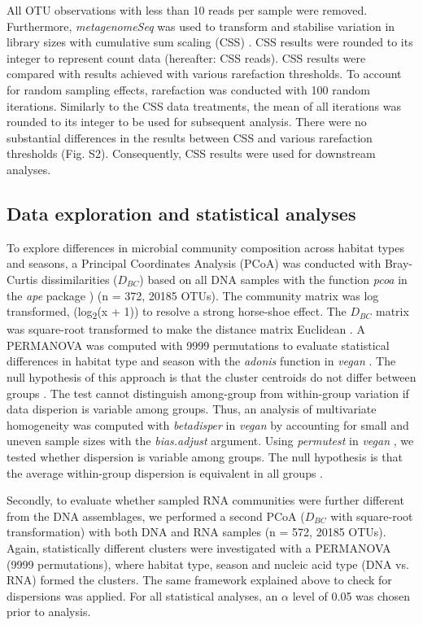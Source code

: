 \documentclass[12pt,a4paper]{article} %
\begin{document}
All OTU observations with less than 10 reads per sample were removed. Furthermore, \textit{metagenomeSeq} was used to transform and stabilise variation in library sizes with cumulative sum scaling (CSS) \citep{Paulson2013}. CSS results were rounded to its integer to represent count data (hereafter: CSS reads). CSS results were compared with results achieved with various rarefaction thresholds. To account for random sampling effects, rarefaction was conducted with 100 random iterations. Similarly to the CSS data treatments, the mean of all iterations was rounded to its integer to be used for subsequent analysis. There were no substantial differences in the results between CSS and various rarefaction thresholds (Fig. S2). Consequently, CSS results were used for downstream analyses.

\subsection*{Data exploration and statistical analyses}
To explore differences in microbial community composition across habitat types and seasons, a Principal Coordinates Analysis (PCoA) was conducted with Bray-Curtis dissimilarities ($D_{BC}$) \citep{Bray1957, Legendre1998} based on all DNA samples with the function \textit{pcoa} in the \textit{ape} package \citep{Paradis2018}) (n = 372, 20185 OTUs). The community matrix was log transformed, (log\textsubscript{2}(x + 1)) to resolve a strong horse-shoe effect. The $D_{BC}$ matrix was square-root transformed to make the distance matrix Euclidean \citep{Legendre1998, Borcard2011}. A PERMANOVA was computed with 9999 permutations to evaluate statistical differences in habitat type and season  with the \textit{adonis} function in \textit{vegan} \citep{Oksanen2017}. The null hypothesis of this approach is that the cluster centroids do not differ between groups \citep{Anderson2013}. The test cannot distinguish among-group from within-group variation if data disperion is variable among groups. Thus, an analysis of multivariate homogeneity was computed with \textit{betadisper} in \textit{vegan} \citep{Oksanen2017} by accounting for small and uneven sample sizes with the \textit{bias.adjust} argument. Using \textit{permutest} in \textit{vegan} \citep{Oksanen2017}, we tested whether dispersion is variable among groups. The null hypothesis is that the average within-group dispersion is equivalent in all groups \citep{Anderson2013}.

Secondly, to evaluate whether sampled RNA communities were further different from the DNA assemblages, we performed a second PCoA ($D_{BC}$ with square-root transformation) with both DNA and RNA samples (n = 572, 20185 OTUs). Again, statistically different clusters were investigated with a PERMANOVA (9999 permutations), where habitat type, season and nucleic acid type (DNA vs. RNA) formed the clusters. The same framework explained above to check for dispersions was applied. For all statistical analyses, an $\alpha$ level of 0.05 was chosen prior to analysis.
\end{document}
